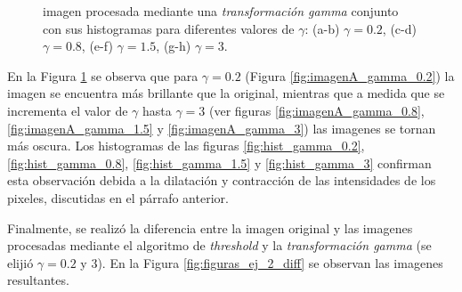 \documentclass[11pt, twocolumn]{article}
\begin{document}
\begin{figure}[H]
  \hfill
  \hfill
  \hfill
  \hfill
  \caption{imagen procesada mediante una \textit{transformación gamma} conjunto con sus histogramas para diferentes valores de $\gamma$: (a-b) $\gamma = 0.2$, (c-d) $\gamma = 0.8$, (e-f) $\gamma = 1.5$, (g-h) $\gamma = 3$.}
  \label{fig:figuras_ej_2_gamma}
\end{figure}

En la Figura \ref{fig:figuras_ej_2_gamma} se observa que para $\gamma = 0.2$ (Figura \ref{fig:imagenA_gamma_0.2}) la imagen se encuentra más brillante que la original, mientras que a medida que se incrementa el valor de $\gamma$ hasta $\gamma = 3$ (ver figuras \ref{fig:imagenA_gamma_0.8}, \ref{fig:imagenA_gamma_1.5} y \ref{fig:imagenA_gamma_3}) las imagenes se tornan más oscura. Los histogramas de las figuras \ref{fig:hist_gamma_0.2}, \ref{fig:hist_gamma_0.8}, \ref{fig:hist_gamma_1.5} y \ref{fig:hist_gamma_3} confirman esta observación debida a la dilatación y contracción de las intensidades de los pixeles, discutidas en el párrafo anterior.

Finalmente, se realizó la diferencia entre la imagen original y las imagenes procesadas mediante el algoritmo de \textit{threshold} y la \textit{transformación gamma} (se elijió $\gamma = 0.2$ y $3$). En la Figura \ref{fig:figuras_ej_2_diff} se observan las imagenes resultantes.
\end{document}
